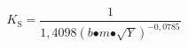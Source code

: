 \[K_{\mathrm{S}}\mathrm{=}\frac{\mathrm{1}}{\mathrm{1,4098}{\left(b\mathrm{\bullet }m\mathrm{\bullet }\sqrt{Y}\right)}^{\mathrm{-}\mathrm{0,0785}}}\]